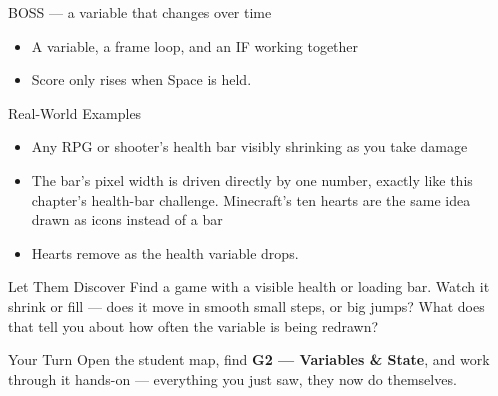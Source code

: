 \documentclass[aspectratio=169]{beamer}
\begin{document}
\begin{frame}{BOSS — a variable that changes over time}
    \large
    \begin{itemize}
        \item A variable, a frame loop, and an IF working together
        \item Score only rises when Space is held.
    \end{itemize}
\end{frame}

\begin{frame}{Real-World Examples}
    \large
    \begin{itemize}
        \item Any RPG or shooter's health bar visibly shrinking as you take damage
        \item The bar's pixel width is driven directly by one number, exactly like this chapter's health-bar challenge. Minecraft's ten hearts are the same idea drawn as icons instead of a bar
        \item Hearts remove as the health variable drops.
    \end{itemize}
\end{frame}


\begin{frame}{Let Them Discover}
    \Large
    Find a game with a visible health or loading bar. Watch it shrink or fill — does it move in smooth small steps, or big jumps? What does that tell you about how often the variable is being redrawn?
\end{frame}

\begin{frame}{Your Turn}
    \Large
    Open the student map, find \textbf{G2 — Variables \& State}, and work through it
    hands-on --- everything you just saw, they now do themselves.
\end{frame}
\end{document}
